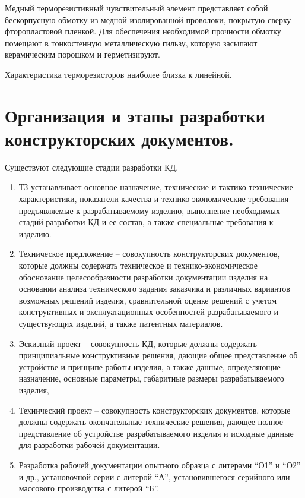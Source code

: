\documentclass[unicode, 12pt, a4paper, oneside]{article}
\begin{document}
Медный терморезистивный чувствительный элемент представляет собой бескорпусную обмотку из медной изолированной проволоки, покрытую сверху фторопластовой пленкой. Для обеспечения необходимой прочности обмотку помещают в тонкостенную металлическую гильзу, которую засыпают керамическим порошком и герметизируют.

Характеристика терморезисторов наиболее близка к линейной.


\section{Организация и этапы разработки конструкторских документов.}

Существуют следующие стадии разработки КД.
\begin{enumerate}
\item ТЗ устанавливает основное назначение, технические и тактико-технические характеристики, показатели качества и технико-экономические требования предъявляемые к разрабатываемому изделию, выполнение необходимых стадий разработки КД и ее состав, а также специальные требования к изделию.
\item Техническое предложение – совокупность конструкторских документов, которые должны содержать техническое и технико-экономическое обоснование целесообразности разработки документации изделия на основании анализа технического задания заказчика и различных вариантов возможных решений изделия, сравнительной оценке решений с учетом конструктивных и эксплуатационных особенностей разрабатываемого и существующих изделий, а также патентных материалов.
\item Эскизный проект – совокупность КД, которые должны содержать принципиальные конструктивные решения, дающие общее представление об устройстве и принципе работы изделия, а также данные, определяющие назначение, основные  параметры, габаритные размеры разрабатываемого изделия, 
\item Технический проект – совокупность конструкторских документов, которые должны содержать окончательные технические решения, дающее полное представление об устройстве разрабатываемого изделия и исходные данные для разработки рабочей документации.
\item Разработка рабочей документации опытного образца с литерами “О1” и “О2” и др., установочной серии с литерой “А”, установившегося серийного или массового производства с литерой “Б”.
\end{enumerate}
\end{document}
